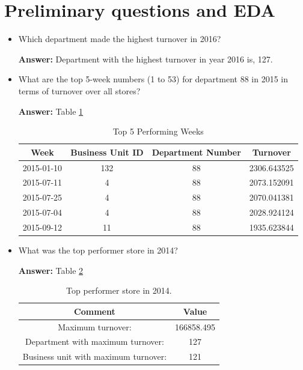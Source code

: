 \section{Preliminary questions and EDA}
\begin{itemize}
    \item Which department made the highest turnover in 2016?\par \textbf{Answer:} Department with the highest turnover in year 2016 is, 127.

    \item What are the top 5-week numbers (1 to 53) for department 88 in 2015 in terms of turnover over all stores?\par \textbf{Answer:} Table \ref{tab:top5weeks}
    \begin{table}[htbp]
        \centering
        \caption{Top 5 Performing Weeks}
        \label{tab:top5weeks}
        \begin{tabular}{|c|c|c|c|}
          \hline
          \textbf{Week} & \textbf{Business Unit ID} & \textbf{Department Number} & \textbf{Turnover} \\
          \hline
          2015-01-10 & 132 & 88 & 2306.643525 \\
          2015-07-11 & 4 & 88 & 2073.152091 \\
          2015-07-25 & 4 & 88 & 2070.041381 \\
          2015-07-04 & 4 & 88 & 2028.924124 \\
          2015-09-12 & 11 & 88 & 1935.623844 \\
          \hline
        \end{tabular}
    \end{table}

    \item What was the top performer store in 2014?\par \textbf{Answer:} Table \ref{tab:Top performer store in 2014}
    \begin{table}[h]
        \centering
        \begin{tabular}{|c|c|}
            \hline
            \textbf{Comment} & \textbf{Value} \\
            \hline
            Maximum turnover: & 166858.495\\
            Department with maximum turnover: & 127 \\
            Business unit with maximum turnover: & 121 \\
            \hline
        \end{tabular}
        \caption{Top performer store in 2014.}
        \label{tab:Top performer store in 2014}
    \end{table}   


\end{itemize}
